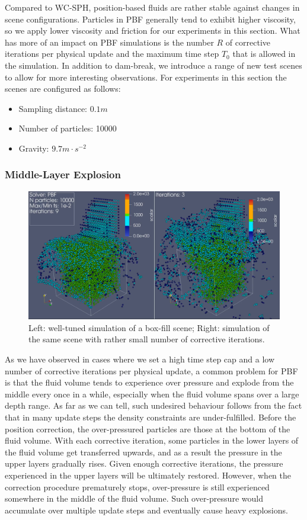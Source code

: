 \documentclass[
	11pt, 
	DIV10,
	ngerman,
	a4paper, 
	oneside, 
	headings=normal, 
	captions=tableheading,
	final, 
	numbers=noenddot
]{scrartcl}
\begin{document}
Compared to WC-SPH, position-based fluids are rather stable against changes in scene configurations. Particles in PBF generally tend to exhibit higher viscosity, so we apply lower viscosity and friction for our experiments in this section. What has more of an impact on PBF simulations is the number $ R $ of corrective iterations per physical update and the maximum time step $ T_{0} $ that is allowed in the simulation. In addition to dam-break, we introduce a range of new test scenes to allow for more interesting observations. For experiments in this section the scenes are configured as follows:

\begin{itemize}
    \item Sampling distance: $ 0.1m $
    \item Number of particles: 10000
    \item Gravity: $ 9.7m \cdot s^{-2} $
\end{itemize}

\subsubsection{Middle-Layer Explosion}

\begin{figure}
    \centering
    \includegraphics[width=.6\textwidth]{pics/pbf_iter.png}
    \caption{Left: well-tuned simulation of a box-fill scene; Right: simulation of the same scene with rather small number of corrective iterations.}
    \label{fig:boxfill}
\end{figure}

As we have observed in cases where we set a high time step cap and a low number of corrective iterations per physical update, a common problem for PBF is that the fluid volume tends to experience over pressure and explode from the middle every once in a while, especially when the fluid volume spans over a large depth range. As far as we can tell, such undesired behaviour follows from the fact that in many update steps the density constraints are under-fulfilled. Before the position correction, the over-pressured particles are those at the bottom of the fluid volume. With each corrective iteration, some particles in the lower layers of the fluid volume get transferred upwards, and as a result the pressure in the upper layers gradually rises. Given enough corrective iterations, the pressure experienced in the upper layers will be ultimately restored. However, when the correction procedure prematurely stops, over-pressure is still experienced somewhere in the middle of the fluid volume. Such over-pressure would accumulate over multiple update steps and eventually cause heavy explosions.
\end{document}
